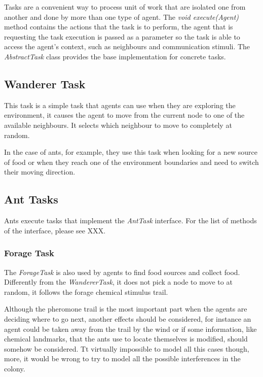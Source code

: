 Tasks are a convenient way to process unit of work that are isolated one from another and done by more than one type of agent. The \emph{void execute(Agent)} method contains the actions that the task is to perform, the agent that is requesting the task execution is passed as a parameter so the task is able to access the agent's context, such as neighbours and communication stimuli. The \emph{AbstractTask} class provides the base implementation for concrete tasks.

\subsection{Wanderer Task}
\label{sec:wanderer-task}

This task is a simple task that agents can use when they are exploring the environment, it causes the agent to move from the current node to one of the available neighbours. It selects which neighbour to move to completely at random.

In the case of ants, for example, they use this task when looking for a new source of food or when they reach one of the environment boundaries and need to switch their moving direction.

\subsection{Ant Tasks}
\label{sec:ant-tasks}

Ants execute tasks that implement the \emph{AntTask} interface. For the list of methods of the interface, please see XXX.

\subsubsection{Forage Task}
\label{task:forage}

The \emph{ForageTask} is also used by agents to find food sources and collect food. Differently from the \emph{WandererTask}, it does not pick a node to move to at random, it follows the forage chemical stimulus trail.

Although the pheromone trail is the most important part when the agents are deciding where to go next, another effects should be considered, for instance an agent could be taken away from the trail by the wind or if some information, like chemical landmarks, that the ants use to locate themselves is modified, should somehow be considered. Tt virtually impossible to model all this cases though, more, it would be wrong to try to model all the possible interferences in the colony.

